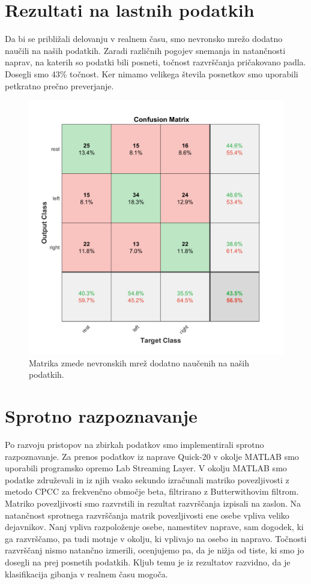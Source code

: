 \section{Rezultati na lastnih podatkih}
Da bi se približali delovanju v realnem času, smo nevronsko mrežo dodatno naučili na naših podatkih. Zaradi različnih pogojev snemanja in natančnosti naprav, na katerih so podatki bili posneti, točnost razvrščanja pričakovano padla. Dosegli smo 43\% točnost. Ker nimamo velikega števila posnetkov smo uporabili petkratno prečno preverjanje. 
\begin{figure}
\begin{center}
\includegraphics[width=0.8\linewidth]{slike/Confusion_13-20Hz_0s-4s_retrained.png}
\end{center}
\caption[Matrika zmede dodatno naučene nevronske mreže.]{Matrika zmede nevronskih mrež dodatno naučenih na naših podatkih.}
\end{figure}


\section{Sprotno razpoznavanje}
Po razvoju pristopov na zbirkah podatkov smo implementirali sprotno razpoznavanje. Za prenos podatkov iz naprave Quick-20 v okolje MATLAB smo uporabili programsko opremo Lab Streaming Layer. V okolju MATLAB smo podatke združevali in iz njih vsako sekundo izračunali matriko povezljivosti z metodo CPCC za frekvenčno območje beta, filtrirano z Butterwithovim filtrom. Matriko povezljivosti smo razvrstili in rezultat razvrščanja izpisali na zaslon. Na natančnost sprotnega razvrščanja matrik povezljivosti ene osebe vpliva veliko dejavnikov. Nanj vpliva razpoloženje osebe, namestitev naprave, sam dogodek, ki ga razvrščamo, pa tudi motnje v okolju, ki vplivajo na osebo in napravo. Točnosti razvrščanj nismo natančno izmerili, ocenjujemo pa, da je nižja od tiste, ki smo jo dosegli na prej posnetih podatkih. Kljub temu je iz rezultatov razvidno, da je klasifikacija gibanja v realnem času mogoča.

